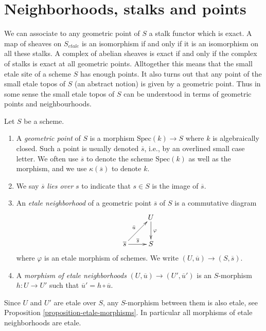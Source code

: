 \section{Neighborhoods, stalks and points}
\label{section-stalks}

\noindent
We can associate to any geometric point of $S$ a stalk functor which is
exact. A map of sheaves on $S_{etale}$ is an isomorphism if and only if it
is an isomorphism on all these stalks. A complex of abelian sheaves is
exact if and only if the complex of stalks is exact at all geometric points.
Alltogether this means that the small etale site of a scheme $S$
has enough points. It also turns out that any point of the small etale topos
of $S$ (an abstract notion) is given by a geometric point.
Thus in some sense the small etale topos of $S$ can be understood in
terms of geometric points and neighbourhoods.

\begin{definition}
\label{definition-geometric-point}
Let $S$ be a scheme.
\begin{enumerate}
\item A {\it geometric point} of $S$ is a morphism
$\text{Spec}(k) \to S$ where $k$ is algebraically closed.
Such a point is usually denoted $\overline{s}$, i.e., by an overlined
small case letter. We often use $\overline{s}$ to denote the scheme
$\text{Spec}(k)$ as well as the morphism, and we use $\kappa(\overline{s})$
to denote $k$.
\item We say $\overline{s}$ {\it lies over} $s$
to indicate that $s \in S$ is the image of $\overline{s}$.
\item An {\it etale neighborhood} of a geometric point $\overline{s}$
of $S$ is a commutative diagram
$$
\xymatrix{
& U \ar^{\varphi}[d] \\
{\overline{s}} \ar^{\overline{s}}[r] \ar^{\bar u}[ur] & S
}
$$
where $\varphi$ is an etale morphism of schemes.
We write $(U, \overline{u}) \to (S, \overline{s})$.
\item A {\it morphism of etale neighborhoods}
$(U, \overline{u}) \to (U', \overline{u}')$
is an $S$-morphism $h: U \to U'$
such that $\overline{u}' = h \circ \overline{u}$.
\end{enumerate}
\end{definition}

\begin{remark}
\label{remark-etale-between-etale}
Since $U$ and $U'$ are etale over $S$, any $S$-morphism
between them is also etale, see
Proposition \ref{proposition-etale-morphisms}.
In particular all morphisms of etale neighborhoods are etale.
\end{remark}

